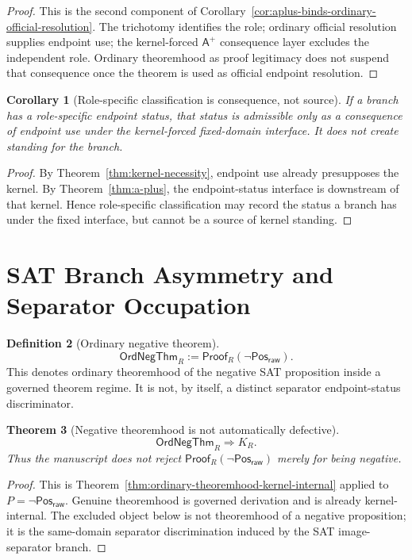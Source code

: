 \documentclass[11pt]{article}
\newtheorem{theorem}{Theorem}[section]
\newtheorem{corollary}[theorem]{Corollary}
\theoremstyle{definition}
\newtheorem{definition}[theorem]{Definition}
\theoremstyle{remark}
\newcommand{\PosRaw}{\mathsf{Pos}_{\mathsf{raw}}}
\newcommand{\Aplus}{\mathsf{A}^{+}}
\newcommand{\ProofR}{\mathsf{Proof}_{R}}
\newcommand{\NegThm}{\mathsf{OrdNegThm}}
\begin{document}
\begin{proof}
This is the second component of Corollary~\ref{cor:aplus-binds-ordinary-official-resolution}. The trichotomy identifies the role; ordinary official resolution supplies endpoint use; the kernel-forced \(\Aplus\) consequence layer excludes the independent role. Ordinary theoremhood as proof legitimacy does not suspend that consequence once the theorem is used as official endpoint resolution.
\end{proof}

\begin{corollary}[Role-specific classification is consequence, not source]\label{cor:role-specific-classification}
If a branch has a role-specific endpoint status, that status is admissible only as a consequence of endpoint use under the kernel-forced fixed-domain interface. It does not create standing for the branch.
\end{corollary}

\begin{proof}
By Theorem~\ref{thm:kernel-necessity}, endpoint use already presupposes the kernel. By Theorem~\ref{thm:a-plus}, the endpoint-status interface is downstream of that kernel. Hence role-specific classification may record the status a branch has under the fixed interface, but cannot be a source of kernel standing.
\end{proof}

\section{SAT Branch Asymmetry and Separator Occupation}\label{sec:sat-branch-asymmetry}

\begin{definition}[Ordinary negative theorem]\label{def:ordinary-negative-theorem}
\[
  \NegThm_R := \ProofR(\neg\PosRaw).
\]
This denotes ordinary theoremhood of the negative SAT proposition inside a governed theorem regime. It is not, by itself, a distinct separator endpoint-status discriminator.
\end{definition}

\begin{theorem}[Negative theoremhood is not automatically defective]\label{thm:negative-theorem-not-defective}
\[
  \NegThm_R\Rightarrow K_R.
\]
Thus the manuscript does not reject \(\ProofR(\neg\PosRaw)\) merely for being negative.
\end{theorem}

\begin{proof}
This is Theorem~\ref{thm:ordinary-theoremhood-kernel-internal} applied to \(P=\neg\PosRaw\). Genuine theoremhood is governed derivation and is already kernel-internal. The excluded object below is not theoremhood of a negative proposition; it is the same-domain separator discrimination induced by the SAT image-separator branch.
\end{proof}
\end{document}
